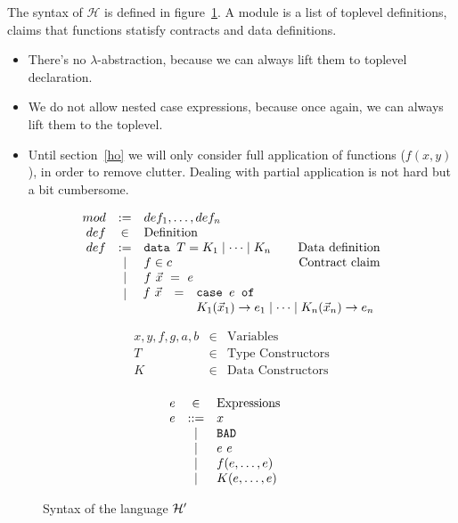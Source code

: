 \documentclass[preprint]{sigplanconf}
\begin{document}
The syntax of $\mathcal{H}$ is defined in figure~\ref{hprime-stx}. A module
is a list of toplevel definitions, claims that functions statisfy
contracts and data definitions.

\begin{itemize}
\item There's no $\lambda$-abstraction, because we can always lift
  them to toplevel declaration.
\item We do not allow nested case expressions, because once again, we
  can always lift them to the toplevel.
\item Until section~\ref{ho} we will only consider full application of
  functions ($f(x,y)$), in order to remove clutter. Dealing with
  partial application is not hard but a bit cumbersome.
\end{itemize}

\begin{figure}[h]
  \centering
  \[
  \begin{array}{rclr}
    mod &:=& def_1,\dots,def_n &\\
    def &\in& \mbox{Definition} & \\
    def &:=& \texttt{data } T = K_1 \mid \cdots \mid K_n & \mbox{Data definition}\\
    &\mid& f \in c & \mbox{Contract claim}\\
    &\mid& f~\vec{x}~=~e & \\
    &\raisebox{ 0.18 cm }{$\mid$}& \multicolumn{2}{c}{
      \begin{array}{rcl}
        \hspace{-0.2cm} f~\vec{x} &=& \texttt{case } e \texttt{ of } \\
         && K_1(\vec{x}_1) \to e_1 \mid \cdots \mid K_n(\vec{x}_n) \to e_n \\
       \end{array} 
       } \\
  \end{array} \]
  
  \[  \begin{array}{rclr}
    x,y,f,g,a,b & \in & \mbox{Variables} \\
    T &\in& \mbox{Type Constructors} \\
    K &\in& \mbox{Data Constructors} \\
  \end{array} \]

  \[  \begin{array}{rclr}
    e &\in& \mbox{Expressions} & \\
    e &::=& x & \\
    &\mid& \texttt{BAD} & \\
    &\mid& e~e & \\
    &\mid& f(e,\dots,e) & \\
    &\mid& K(e,\dots,e) & \\
  \end{array} \]

\caption{Syntax of the language $\mathcal{H}'$}
\label{hprime-stx}
\end{figure}
\end{document}
